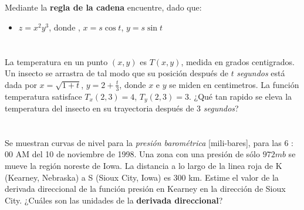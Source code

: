 \documentclass[12pt]{article}
\begin{document}
\section{}

Mediante la \textbf{regla de la cadena} encuentre, dado que:

\begin{itemize}[format=\textbf]

\item $z=x^2y^3$, donde , $x=s\cos{t}$, $y=s\sin{t}$

\end{itemize}

\section{}

La temperatura en un punto $(x, y)$ es $T(x, y)$, medida en grados centigrados. Un insecto se arrastra de tal modo que su posición después de $t$ \textit{segundos} está dada por $x =
\sqrt{1 + t}$, $y = 2 + \frac{t}{3}$, donde $x$ e $y$ se miden en centimetros. La función temperatura satisface $T_x(2, 3) = 4$, $T_y(2, 3) = 3$.
¿Qué tan rapido se eleva la temperatura del insecto en su trayectoria después de 3 \textit{segundos}?

\section{}

Se muestran curvas de nivel para la \textit{presión barométrica} [mili-bares], para las 6 : 00 AM del 10 de noviembre de 1998. Una zona con una presión de
sólo $972 mb$ se mueve la región noreste de Iowa. La distancia a lo largo de la linea roja de K (Kearney, Nebraska) a S (Sioux City, Iowa) es 300 km. Estime el valor de la derivada direccional de la función presión en Kearney en la dirección de Sioux City. ¿Cuáles son las unidades de la \textbf{derivada
direccional}?

\section{}
\end{document}
